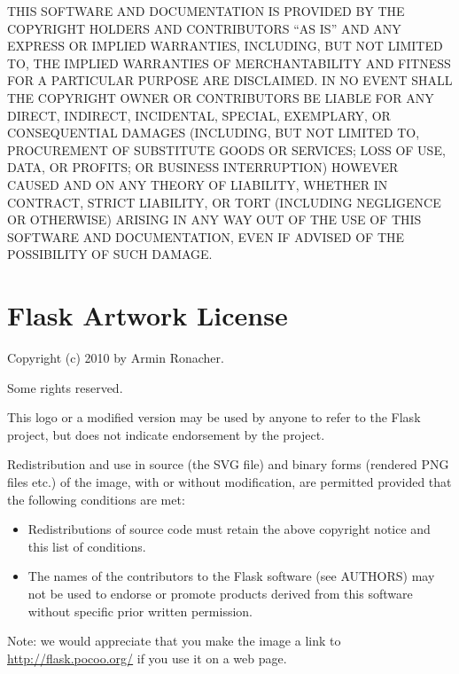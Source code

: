 \documentclass[a4paper,12pt]{sphinxmanual}
\begin{document}
THIS SOFTWARE AND DOCUMENTATION IS PROVIDED BY THE COPYRIGHT HOLDERS AND
CONTRIBUTORS ``AS IS'' AND ANY EXPRESS OR IMPLIED WARRANTIES, INCLUDING, BUT
NOT LIMITED TO, THE IMPLIED WARRANTIES OF MERCHANTABILITY AND FITNESS FOR
A PARTICULAR PURPOSE ARE DISCLAIMED. IN NO EVENT SHALL THE COPYRIGHT OWNER
OR CONTRIBUTORS BE LIABLE FOR ANY DIRECT, INDIRECT, INCIDENTAL, SPECIAL,
EXEMPLARY, OR CONSEQUENTIAL DAMAGES (INCLUDING, BUT NOT LIMITED TO,
PROCUREMENT OF SUBSTITUTE GOODS OR SERVICES; LOSS OF USE, DATA, OR
PROFITS; OR BUSINESS INTERRUPTION) HOWEVER CAUSED AND ON ANY THEORY OF
LIABILITY, WHETHER IN CONTRACT, STRICT LIABILITY, OR TORT (INCLUDING
NEGLIGENCE OR OTHERWISE) ARISING IN ANY WAY OUT OF THE USE OF THIS
SOFTWARE AND DOCUMENTATION, EVEN IF ADVISED OF THE POSSIBILITY OF SUCH
DAMAGE.


\section{Flask Artwork License}
\label{license:artwork-license}\label{license:flask-artwork-license}
Copyright (c) 2010 by Armin Ronacher.

Some rights reserved.

This logo or a modified version may be used by anyone to refer to the
Flask project, but does not indicate endorsement by the project.

Redistribution and use in source (the SVG file) and binary forms (rendered
PNG files etc.) of the image, with or without modification, are permitted
provided that the following conditions are met:
\begin{itemize}
\item {} 
Redistributions of source code must retain the above copyright
notice and this list of conditions.

\item {} 
The names of the contributors to the Flask software (see AUTHORS) may
not be used to endorse or promote products derived from this software
without specific prior written permission.

\end{itemize}

Note: we would appreciate that you make the image a link to
\href{http://flask.pocoo.org/}{http://flask.pocoo.org/} if you use it on a web page.



\renewcommand{\indexname}{索引}
\printindex
\end{document}
